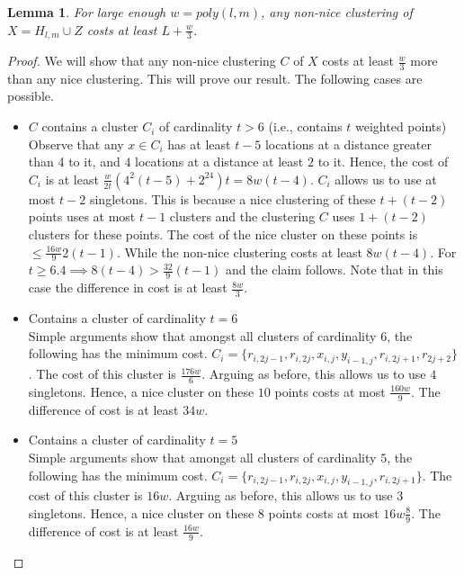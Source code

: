 \documentclass[12pt]{article}
\newtheorem{lemma}[theorem]{Lemma}
\begin{document}
\begin{lemma}
\label{lemma:costNonNice}
For large enough $w = poly(l, m)$, any non-nice clustering of $X = H_{l, m} \cup Z$ costs at least $L + \frac{w}{3}$.
\end{lemma}

\begin{proof}
We will show that any non-nice clustering $C$ of $X$ costs at least $\frac{w}{3}$ more than any nice clustering. This will prove our result. The following cases are possible.

\begin{itemize}[nolistsep,leftmargin=*]
\item $C$ contains a cluster $C_i$ of cardinality $t > 6$ (i.e., contains $t$ weighted points)\\
Observe that any $x \in C_i$ has at least $t-5$ locations at a distance greater than 4 to it, and $4$ locations at a distance at least $2$ to it. Hence, the cost of $C_i$ is at least $\frac{w}{2t}(4^2(t-5)+2^24)t = 8w(t-4)$. $C_i$ allows us to use at most $t-2$ singletons. This is because a nice clustering of these $t+(t-2)$ points uses at most $t-1$ clusters and the clustering $C$ uses  $1 + (t-2)$ clusters for these points. The cost of the nice cluster on these points is $\le \frac{16w}{9}2(t-1)$. While the non-nice clustering costs at least $8w(t-4)$. For $t \ge 6.4 \implies 8(t-4) > \frac{32}{9}(t-1)$ and the claim follows. Note that in this case the difference in cost is at least $\frac{8w}{3}$. 

\item Contains a cluster of cardinality $t = 6$\\
Simple arguments show that amongst all clusters of cardinality $6$, the following has the minimum cost. $C_i = \{r_{i, 2j-1}, r_{i, 2j}, x_{i,j}, y_{i-1, j}, r_{i, 2j+1}, r_{2j+2}\}$. The cost of this cluster is $\frac{176w}{6}$. Arguing as before, this allows us to use $4$ singletons. Hence, a nice cluster on these $10$ points costs at most $\frac{160w}{9}$. The difference of cost is at least $34w$.  

\item Contains a cluster of cardinality $t = 5$\\
Simple arguments show that amongst all clusters of cardinality $5$, the following has the minimum cost. $C_i = \{r_{i, 2j-1}, r_{i, 2j}, x_{i,j}, y_{i-1, j}, r_{i, 2j+1}\}$. The cost of this cluster is $16w$. Arguing as before, this allows us to use $3$ singletons. Hence, a nice cluster on these $8$ points costs at most $16w\frac{8}{9}$. The difference of cost is at least $\frac{16w}{9}$.  


\end{itemize}
\end{proof}
\end{document}
